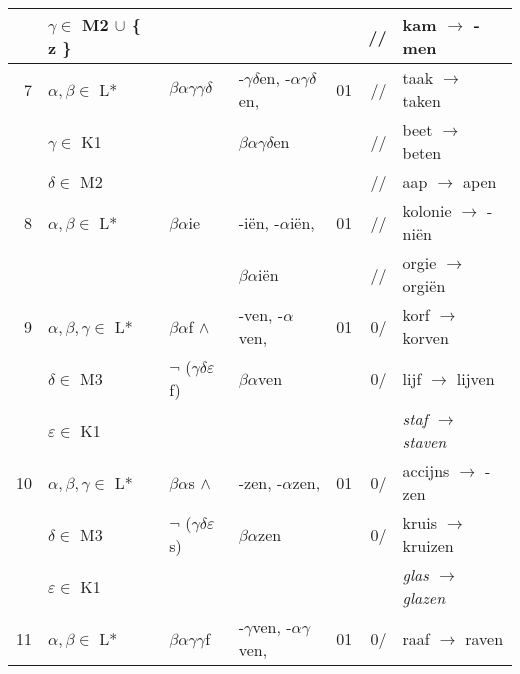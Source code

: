 \begin{tabular}{|r|l|l|l|r|r|l|}
     & $\gamma \in$ M2 $\cup$ \{ z \}
       &
         &
           & 
             & //
               & kam $\rightarrow$ -men\\ \hline
   7 & $\alpha,\beta \in$ L*
       & $\beta\alpha\gamma\gamma\delta$
         & -$\gamma\delta$en, -$\alpha\gamma\delta$en, 
           & 01
             & //
               & taak $\rightarrow$ taken \\
     & $\gamma \in$ K1
       &
         & $\beta\alpha\gamma\delta$en
           & 
             & //
               & beet $\rightarrow$ beten \\
     & $\delta \in$ M2
       &
         &
           & 
             & //
               & aap $\rightarrow$ apen \\ \hline
   8 & $\alpha,\beta \in$ L*
       & $\beta\alpha$ie
         & -i\"{e}n, -$\alpha$i\"{e}n, 
           & 01
             & //
               & kolonie $\rightarrow$ -ni\"{e}n \\ 
     &
       &
         & $\beta\alpha$i\"{e}n
           & 
             & //
               & orgie $\rightarrow$ orgi\"{e}n\\ \hline
   9 & $\alpha,\beta,\gamma \in$ L*
       & $\beta\alpha$f $\wedge$
         & -ven, -$\alpha$ven,
           & 01
             & 0/
               & korf $\rightarrow$ korven \\ 
     & $\delta \in$ M3
       & $\neg$ ($\gamma\delta\varepsilon$f)
         & $\beta\alpha$ven
           & 
             & 0/
               & lijf $\rightarrow$ lijven \\
     & $\varepsilon \in$ K1
       &
         &
           & 
             & 
               & {\em staf $\rightarrow$ staven} \\ \hline
  10 & $\alpha,\beta,\gamma \in$ L*
       & $\beta\alpha$s $\wedge$
         & -zen, -$\alpha$zen,
           & 01
             & 0/
               & accijns $\rightarrow$ -zen \\ 
     & $\delta \in$ M3
       & $\neg$ ($\gamma\delta\varepsilon$s)
         & $\beta\alpha$zen
           & 
             & 0/
               & kruis $\rightarrow$ kruizen\\
     & $\varepsilon \in$ K1
       &
         &
           & 
             & 
               & {\em glas $\rightarrow$ glazen} \\ \hline
  11 & $\alpha,\beta \in$ L*
       & $\beta\alpha\gamma\gamma$f
         & -$\gamma$ven, -$\alpha\gamma$ven, 
           & 01
             & 0/
               & raaf $\rightarrow$ raven \\

\end{tabular}
